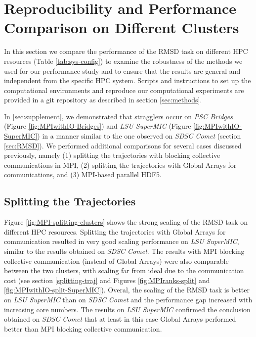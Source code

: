 
\section{Reproducibility and Performance Comparison on Different Clusters}
\label{sec:clusters}

In this section we compare the performance of the RMSD task on different HPC resources (Table \ref{tab:sys-config}) to examine the robustness of the methods we used for our performance study and to ensure that the results are general and independent from the specific HPC system.
Scripts and instructions to set up the computational environments and reproduce our computational experiments are provided in a git repository as described in section \ref{sec:methods}.

In \ref{sec:supplement}, we demonstrated that stragglers occur on \emph{PSC Bridges} (Figure \ref{fig:MPIwithIO-Bridges}) and \emph{LSU SuperMIC} (Figure \ref{fig:MPIwithIO-SuperMIC}) in a manner similar to the one observed on \emph{SDSC Comet} (section \ref{sec:RMSD}).
We performed additional comparisons for several cases discussed previously, namely (1) splitting the trajectories with blocking collective communications in MPI, (2) splitting the trajectories with Global Arrays for communications, and (3) MPI-based parallel HDF5.

\subsection{Splitting the Trajectories}
Figure \ref{fig:MPI-splitting-clusters} shows the strong scaling of the RMSD task on different HPC resources.  
Splitting the trajectories with Global Arrays for communication resulted in very good scaling performance on \emph{LSU SuperMIC}, similar to the results obtained on \emph{SDSC Comet}.
The results with MPI blocking collective communication (instead of Global Arrays) were also comparable between the two clusters, with scaling far from ideal due to the communication cost (see section \ref{splitting-traj} and Figures \ref{fig:MPIranks-split} and \ref{fig:MPIwithIO-split-SuperMIC}). 
Overal, the scaling of the RMSD task is better on \emph{LSU SuperMIC} than on \emph{SDSC Comet} and the performance gap increased with increasing core numbers.
The results on \emph{LSU SuperMIC} confirmed the conclusion obtained on \emph{SDSC Comet} that at least in this case Global Arrays performed better than MPI blocking collective communication.

